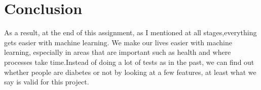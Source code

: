 \documentclass[onecolumn]{article}
\begin{document}
\newpage

\section{Conclusion}

As a result, at the end of this assignment, as I mentioned at all stages,everything gets easier with machine learning. We make our lives easier with machine learning, especially in areas that are important such as health and where processes take time.Instead of doing a lot of tests as in the past, we can find out whether people are diabetes or not by looking at a few features, at least what we say is valid for this project.

\nocite{*}


\end{document}
